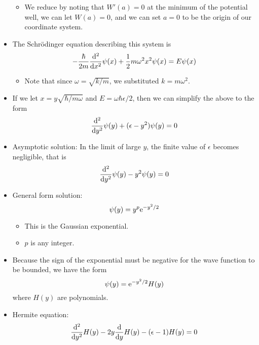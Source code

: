 \documentclass[../notes.tex]{subfiles}
\begin{document}
\begin{itemize}
    \begin{itemize}
        \item We reduce by noting that $W'(a)=0$ at the minimum of the potential well, we can let $W(a)=0$, and we can set $a=0$ to be the origin of our coordinate system.
    \end{itemize}
    \item The Schr\"{o}dinger equation describing this system is
    \begin{equation*}
        -\frac{\hbar}{2m}\dv[2]{x}\psi(x)+\frac{1}{2}m\omega^2x^2\psi(x) = E\psi(x)
    \end{equation*}
    \begin{itemize}
        \item Note that since $\omega=\sqrt{k/m}$, we substituted $k=m\omega^2$.
    \end{itemize}
    \item If we let $x=y\sqrt{\hbar/m\omega}$ and $E=\omega\hbar\epsilon/2$, then we can simplify the above to the form
    \begin{equation*}
        \dv[2]{y}\psi(y)+(\epsilon-y^2)\psi(y) = 0
    \end{equation*}
    \item Asymptotic solution: In the limit of large $y$, the finite value of $\epsilon$ becomes negligible, that is
    \begin{equation*}
        \dv[2]{y}\psi(y)-y^2\psi(y) = 0
    \end{equation*}
    \item General form solution:
    \begin{equation*}
        \psi(y) = y^p\e[-y^2/2]
    \end{equation*}
    \begin{itemize}
        \item This is the Gaussian exponential.
        \item $p$ is any integer.
    \end{itemize}
    \item Because the sign of the exponential must be negative for the wave function to be bounded, we have the form
    \begin{equation*}
        \psi(y) = \e[-y^2/2]H(y)
    \end{equation*}
    where $H(y)$ are polynomials.
    \item Hermite equation:
    \begin{equation*}
        \dv[2]{y}H(y)-2y\dv{y}H(y)-(\epsilon-1)H(y) = 0
    \end{equation*}

\end{itemize}
\end{document}
